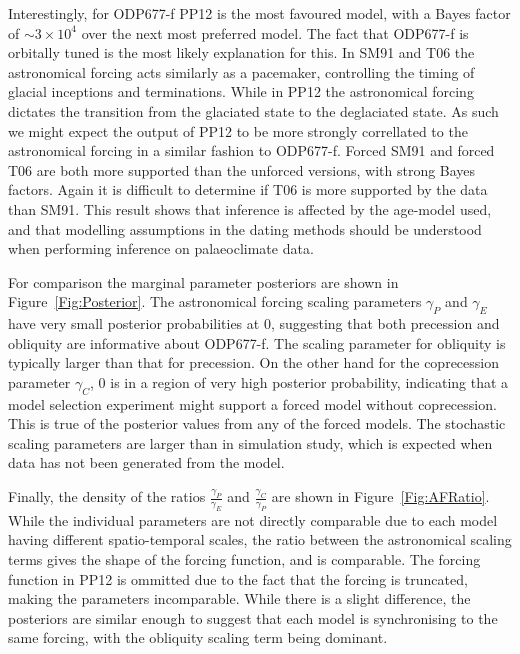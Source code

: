 \documentclass[a4paper,12pt]{article}
\begin{document}
Interestingly, for ODP677-f PP12 is the most favoured model, with a Bayes factor of $\sim 3 \times 10^4$ over the next most preferred model.
The fact that ODP677-f is orbitally tuned is the most likely explanation for this.
In SM91 and T06 the astronomical forcing acts similarly as a pacemaker, controlling the timing of glacial inceptions and terminations. 
While in PP12 the astronomical forcing dictates the transition from the glaciated state to the deglaciated state.
As such we might expect the output of PP12 to be more strongly correllated to the astronomical forcing in a similar fashion to ODP677-f.
Forced SM91 and forced T06 are both more supported than the unforced versions, with strong Bayes factors.
Again it is difficult to determine if T06 is more supported by the data than SM91.
This result shows that inference is affected by the age-model used, and that modelling assumptions in the dating methods should be understood when performing inference on palaeoclimate data.

For comparison the marginal parameter posteriors are shown in Figure~\ref{Fig:Posterior}.
The astronomical forcing scaling parameters $\gamma_P$ and $\gamma_E$ have very small posterior probabilities at 0, suggesting that both precession and obliquity are informative about ODP677-f.
The scaling parameter for obliquity is typically larger than that for precession.
On the other hand for the coprecession parameter $\gamma_C$, 0 is in a region of very high posterior probability, indicating that a model selection experiment might support a forced model without coprecession.
This is true of the posterior values from any of the forced models.
The stochastic scaling parameters are larger than in simulation study, which is expected when data has not been generated from the model.

Finally, the density of the ratios $\frac{\gamma_P}{\gamma_E}$ and $\frac{\gamma_C}{\gamma_P}$ are shown in Figure~\ref{Fig:AFRatio}.
While the individual parameters are not directly comparable due to each model having different spatio-temporal scales, the ratio between the astronomical scaling terms gives the shape of the forcing function, and is comparable.
The forcing function in PP12 is ommitted due to the fact that the forcing is truncated, making the parameters incomparable.
While there is a slight difference, the posteriors are similar enough to suggest that each model is synchronising to the same forcing, with the obliquity scaling term being dominant.
\end{document}
